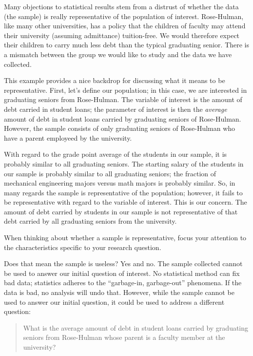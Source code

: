 \documentclass[]{book}
\theoremstyle{plain}
\theoremstyle{mydefn}
\theoremstyle{myexmpl}
\theoremstyle{remark}
\let\BeginKnitrBlock\begin \let\EndKnitrBlock\end
\let\BeginKnitrBlock\begin \let\EndKnitrBlock\end
\begin{document}
Many objections to statistical results stem from a distrust of whether
the data (the sample) is really representative of the population of
interest. Rose-Hulman, like many other universities, has a policy that
the children of faculty may attend their university (assuming
admittance) tuition-free. We would therefore expect their children to
carry much less debt than the typical graduating senior. There is a
mismatch between the group we would like to study and the data we have
collected.

This example provides a nice backdrop for discussing what it means to be
representative. First, let's define our population; in this case, we are
interested in graduating seniors from Rose-Hulman. The variable of
interest is the amount of debt carried in student loans; the parameter
of interest is then the \emph{average} amount of debt in student loans
carried by graduating seniors of Rose-Hulman. However, the sample
consists of only graduating seniors of Rose-Hulman who have a parent
employeed by the university.

With regard to the grade point average of the students in our sample, it
is probably similar to all graduating seniors. The starting salary of
the students in our sample is probably similar to all graduating
seniors; the fraction of mechanical engineering majors versus math
majors is probably similar. So, in many regards the sample is
representative of the population; however, it fails to be representative
with regard to the variable of interest. This is our concern. The amount
of debt carried by students in our sample is not representative of that
debt carried by all graduating seniors from the university.

\BeginKnitrBlock{rmdtip}
When thinking about whether a sample is representative, focus your
attention to the characteristics specific to your research question.
\EndKnitrBlock{rmdtip}

Does that mean the sample is useless? Yes and no. The sample collected
cannot be used to answer our initial question of interest. No
statistical method can fix bad data; statistics adheres to the
``garbage-in, garbage-out'' phenomena. If the data is bad, no analysis
will undo that. However, while the sample cannot be used to answer our
initial question, it could be used to address a different question:

\begin{quote}
What is the average amount of debt in student loans carried by
graduating seniors from Rose-Hulman whose parent is a faculty member at
the university?
\end{quote}
\end{document}
